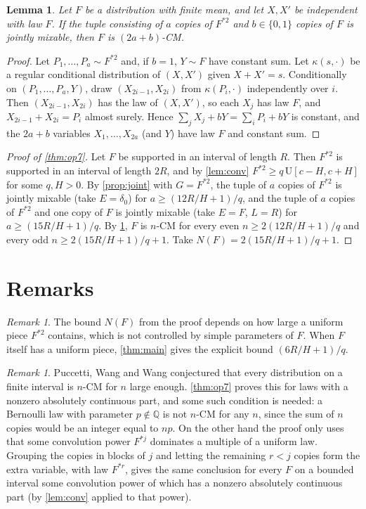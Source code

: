 ﻿\documentclass[11pt]{amsart}
\newtheorem{lemma}[theorem]{Lemma}
\theoremstyle{remark}
\newtheorem{remark}[theorem]{Remark}
\newcommand{\U}{\mathrm{U}}
\begin{document}
\begin{lemma}\label{lem:lift}
Let $F$ be a distribution with finite mean, and let $X,X'$ be independent with law $F$. If the tuple consisting of $a$ copies of $F^{*2}$ and $b\in\{0,1\}$ copies of $F$ is jointly mixable, then $F$ is $(2a+b)$-CM.
\end{lemma}

\begin{proof}
Let $P_1,\dots,P_a\sim F^{*2}$ and, if $b=1$, $Y\sim F$ have constant sum. Let $\kappa(s,\cdot)$ be a regular conditional distribution of $(X,X')$ given $X+X'=s$. Conditionally on $(P_1,\dots,P_a,Y)$, draw $(X_{2i-1},X_{2i})$ from $\kappa(P_i,\cdot)$ independently over $i$. Then $(X_{2i-1},X_{2i})$ has the law of $(X,X')$, so each $X_j$ has law $F$, and $X_{2i-1}+X_{2i}=P_i$ almost surely. Hence $\sum_jX_j+bY=\sum_iP_i+bY$ is constant, and the $2a+b$ variables $X_1,\dots,X_{2a}$ (and $Y$) have law $F$ and constant sum.
\end{proof}

\begin{proof}[Proof of \cref{thm:op7}]
Let $F$ be supported in an interval of length $R$. Then $F^{*2}$ is supported in an interval of length $2R$, and by \cref{lem:conv} $F^{*2}\ge q\,\U[c-H,c+H]$ for some $q,H>0$. By \cref{prop:joint} with $G=F^{*2}$, the tuple of $a$ copies of $F^{*2}$ is jointly mixable (take $E=\delta_0$) for $a\ge(12R/H+1)/q$, and the tuple of $a$ copies of $F^{*2}$ and one copy of $F$ is jointly mixable (take $E=F$, $L=R$) for $a\ge(15R/H+1)/q$. By \cref{lem:lift}, $F$ is $n$-CM for every even $n\ge2(12R/H+1)/q$ and every odd $n\ge2(15R/H+1)/q+1$. Take $N(F)=2(15R/H+1)/q+1$.
\end{proof}

\section{Remarks}

\begin{remark}
The bound $N(F)$ from the proof depends on how large a uniform piece $F^{*2}$ contains, which is not controlled by simple parameters of $F$. When $F$ itself has a uniform piece, \cref{thm:main} gives the explicit bound $(6R/H+1)/q$.
\end{remark}

\begin{remark}
Puccetti, Wang and Wang conjectured \cite[Section~6]{PWW12} that every distribution on a finite interval is $n$-CM for $n$ large enough. \cref{thm:op7} proves this for laws with a nonzero absolutely continuous part, and some such condition is needed: a Bernoulli law with parameter $p\notin\mathbb Q$ is not $n$-CM for any $n$, since the sum of $n$ copies would be an integer equal to $np$. On the other hand the proof only uses that some convolution power $F^{*j}$ dominates a multiple of a uniform law. Grouping the copies in blocks of $j$ and letting the remaining $r<j$ copies form the extra variable, with law $F^{*r}$, gives the same conclusion for every $F$ on a bounded interval some convolution power of which has a nonzero absolutely continuous part (by \cref{lem:conv} applied to that power).
\end{remark}
\end{document}
